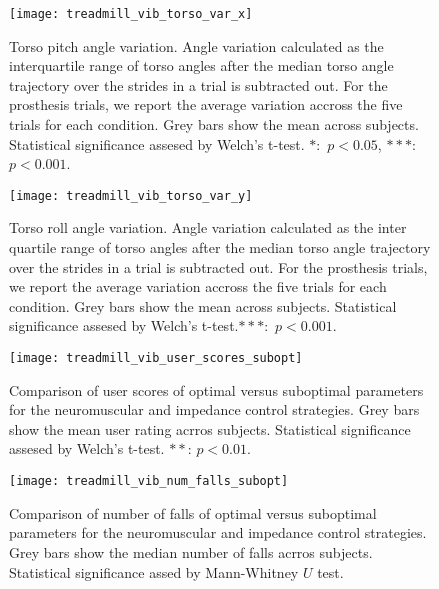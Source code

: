 \begin{figure}[h]
    \centering 
    \texttt{[image: treadmill\_vib\_torso\_var\_x]}
    \caption{Torso pitch angle variation. Angle variation calculated as the
    interquartile range of torso angles after the median torso angle trajectory
    over the strides in a trial is subtracted out. For the prosthesis trials, we
    report the average variation accross the five trials for each condition.
    Grey bars show the mean across subjects.  Statistical significance assesed
    by Welch's t-test. $*$:~$p < 0.05$, $***$:~$p <
    0.001$.}\label{fig:treadmill_exp_torso_var_x}
\end{figure}

\begin{figure}[h]
    \centering 
    \texttt{[image: treadmill\_vib\_torso\_var\_y]}
    \caption{Torso roll angle variation. Angle variation calculated as the inter
    quartile range of torso angles after the median torso angle trajectory over
    the strides in a trial is subtracted out. For the prosthesis trials, we
    report the average variation accross the five trials for each condition.
    Grey bars show the mean across subjects.  Statistical significance assesed
    by Welch's t-test.$***$:~$p < 0.001$.}\label{fig:treadmill_exp_torso_var_y}
\end{figure}

\begin{figure}[h]
    \centering 
    \texttt{[image: treadmill\_vib\_user\_scores\_subopt]}
    \caption{Comparison of user scores of optimal versus suboptimal parameters
    for the neuromuscular and impedance control strategies. Grey bars show the
    mean user rating acrros subjects. Statistical significance assesed by
    Welch's t-test. $**$: $p <
    0.01$.}\label{fig:treadmill_exp_user_ratings_subopt}
\end{figure}

\begin{figure}[h]
    \centering 
    \texttt{[image: treadmill\_vib\_num\_falls\_subopt]}
    \caption{Comparison of number of falls of optimal versus suboptimal
    parameters for the neuromuscular and impedance control strategies. Grey bars
    show the median number of falls acrros subjects. Statistical significance
    assed by Mann-Whitney $U$
    test.}\label{fig:treadmill_exp_user_ratings_subopt}
\end{figure}
